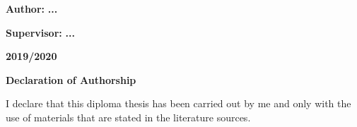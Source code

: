 \documentclass{article}
\begin{document}
\begin{Large}
\begin{center}
\end{center}

\begin{flushleft}


\vspace{1cm}

\textbf{Author:}\hspace*{\fill}
\textbf{...}

\vspace{0,5cm}

\textbf{Supervisor:} \hspace*{\fill}
\textbf{...}




\vspace{1cm}

\end{flushleft}

\begin{center}

\textbf{2019/2020} 

\end{center}

\end{Large}









\newpage

\vspace*{\fill}
\begin{Large}

\noindent \textbf{Declaration of Authorship}

\end{Large}

\vspace{0.5cm}

\noindent I declare that this diploma thesis has been carried out by me and only with the use of materials that are stated in the literature sources. 
\end{document}
